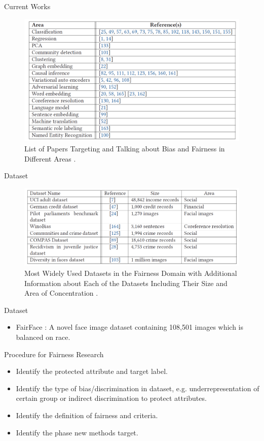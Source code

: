 \documentclass[10pt, xcolor=table,aspectratio=169]{beamer}
\begin{document}
\begin{frame}{Current Works}
	\begin{figure}[t]
		\begin{center}
			\includegraphics[width=0.6\columnwidth]{./figs/list_mlf.png}
		\end{center}
		\caption{List of Papers Targeting and Talking about Bias and Fairness in Different Areas \cite{mehrabi2021survey}.}
	\end{figure}
\end{frame}

\begin{frame}{Dataset}
	\begin{figure}[t]
		\begin{center}
			\includegraphics[width=0.8\columnwidth]{./figs/dataset.png}
		\end{center}
		\caption{Most Widely Used Datasets in the Fairness Domain with Additional Information about Each of the Datasets Including Their Size and Area of Concentration \cite{mehrabi2021survey}.}
	\end{figure}
\end{frame}

\begin{frame}{Dataset}
	\begin{itemize}
		\item FairFace \cite{karkkainen2021fairface}:  A novel face image dataset containing 108,501 images which is balanced on race.
	\end{itemize}

\end{frame}

\begin{frame}{Procedure for Fairness Research}
	\begin{itemize}
		\item Identify the protected attribute and target label.
		\item Identify the type of bias/discrimination in dataset, e.g. underrepresentation of certain group or indirect discrimination to protect attributes.
		\item Identify the definition of fairness and criteria.
		\item Identify the phase new methods target.
	\end{itemize}

\end{frame}
\end{document}
